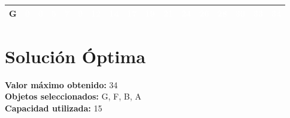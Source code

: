 \documentclass{article}
\begin{document}
\begin{center}
\begin{tabular}{|c|c|c|c|c|c|c|c|c|c|c|c|c|c|c|c|c|}
G & \cellcolor{rojo}\textcolor{white}{0} & \cellcolor{rojo}\textcolor{white}{0} & \cellcolor{rojo}\textcolor{white}{5} & \cellcolor{rojo}\textcolor{white}{7} & \cellcolor{rojo}\textcolor{white}{9} & \cellcolor{rojo}\textcolor{white}{12} & \cellcolor{rojo}\textcolor{white}{14} & \cellcolor{verde}\textcolor{white}{17} & \cellcolor{verde}\textcolor{white}{19} & \cellcolor{rojo}\textcolor{white}{21} & \cellcolor{verde}\textcolor{white}{24} & \cellcolor{verde}\textcolor{white}{26} & \cellcolor{verde}\textcolor{white}{28} & \cellcolor{verde}\textcolor{white}{30} & \cellcolor{verde}\textcolor{white}{33} & \cellcolor{verde}\textcolor{white}{34} \\ \hline
\end{tabular}
\end{center}
\normalsize

\section*{Solución Óptima}
\textbf{Valor máximo obtenido:} 34\\
\textbf{Objetos seleccionados:} G, F, B, A\\
\textbf{Capacidad utilizada:} 15\\
\end{document}

